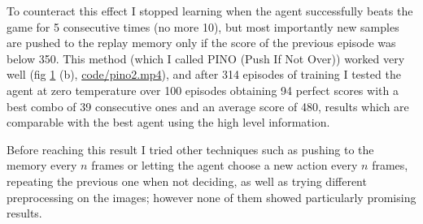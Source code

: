 \documentclass[a4paper, 11pt]{article}
\begin{document}
  To counteract this effect I stopped learning when the agent successfully beats the game for 5 consecutive times (no more 10), but most importantly new samples are pushed to the replay memory only if the score of the previous episode was below 350. This method (which I called PINO (Push If Not Over)) worked very well (fig \ref{fig:pixels} (b), \url{code/pino2.mp4}), and after 314 episodes of training I tested the agent at zero temperature over 100 episodes obtaining 94 perfect scores with a best combo of 39 consecutive ones and an average score of 480, results which are comparable with the best agent using the high level information.

  Before reaching this result I tried other techniques such as pushing to the memory every $n$ frames or letting the agent choose a new action every $n$ frames, repeating the previous one when not deciding, as well as trying different preprocessing on the images; however none of them showed particularly promising results.

  \begin{figure}
    \centering
     \quad
    \caption{}
    \label{fig:pixels}
  \end{figure}
\end{document}
